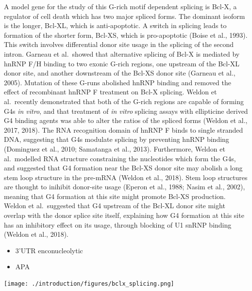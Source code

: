 \documentclass[12pt,a4paper,]{report}
\let\origfigure=\figure
\let\endorigfigure=\endfigure
\renewenvironment{figure}[1][2] {
    \expandafter\origfigure\expandafter[H]
} {
    \endorigfigure
}
\providecommand{\tightlist}{%
  \setlength{\itemsep}{0pt}\setlength{\parskip}{0pt}}
\begin{document}
A model gene for the study of this G-rich motif dependent splicing is
Bcl-X, a regulator of cell death which has two major spliced forms. The
dominant isoform is the longer, Bcl-XL, which is anti-apoptotic. A
switch in splicing leads to formation of the shorter form, Bcl-XS, which
is pro-apoptotic (Boise et al., 1993). This switch involves differential
donor site usage in the splicing of the second intron. Garneau et
al.~showed that alternative splicing of Bcl-X is mediated by hnRNP F/H
binding to two exonic G-rich regions, one upstream of the Bcl-XL donor
site, and another downstream of the Bcl-XS donor site (Garneau et al.,
2005). Mutation of these G-runs abolished hnRNP binding and removed the
effect of recombinant hnRNP F treatment on Bcl-X splicing. Weldon et
al.~recently demonstrated that both of the G-rich regions are capable of
forming G4s \emph{in vitro}, and that treatment of \emph{in vitro}
splicing assays with ellipticine derived G4 binding agents was able to
alter the ratios of the spliced forms (Weldon et al., 2017, 2018). The
RNA recognition domain of hnRNP F binds to single stranded DNA,
suggesting that G4s modulate splicing by preventing hnRNP binding
(Dominguez et al., 2010; Samatanga et al., 2013). Furthermore, Weldon et
al.~modelled RNA structure constraining the nucleotides which form the
G4s, and suggested that G4 formation near the Bcl-XS donor site may
abolish a long stem loop structure in the pre-mRNA (Weldon et al.,
2018). Stem loop structures are thought to inihibit donor-site usage
(Eperon et al., 1988; Nasim et al., 2002), meaning that G4 formation at
this site might promote Bcl-XS production. Weldon et al.~suggested that
G4 upstream of the Bcl-XL donor site might overlap with the donor splice
site itself, explaining how G4 formation at this site has an inhibitory
effect on its usage, through blocking of U1 snRNP binding (Weldon et
al., 2018).

\begin{itemize}
\tightlist
\item
  3'UTR enconucleolytic
\item
  APA
\end{itemize}

\newpage

\begin{figure}[htbp]
\centering
\texttt{[image: ./introduction/figures/bclx\_splicing.png]}
\caption[G-Quadruplexes control the splicing of Bcl-X pre-mRNA]{\textbf{G-Quadruplexes   control   the   splicing   of   Bcl-X   pre-mRNA}   \textbf{a)}   Diagram   showing   the   splice   isoforms   Bcl-XS   and   Bcl-XL,   which   are   derived   from   alternative   splicing   of   exon   2.   \textbf{b)}   RNA   structure   of   Bcl-X-681   (a   synthetic   transcript   derived   from   Bcl-X)   showing   positions   of   G4s   and   splice   donor/acceptor   sites.   Formation   of   a   G4   near   Bcl-XS   donor   site   promotes   usage   of   the   XS   splice   donor.   Formation   of   a   G4   near   Bcl-XL   donor   site   inhibits   usage   of   the   XL   splice   donor.   Adapted   from   Weldon   et   al. 2018}
\end{figure}
\end{document}
